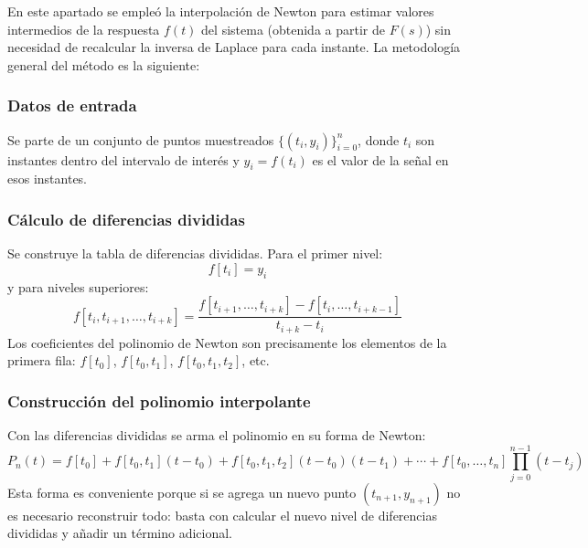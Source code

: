 \documentclass[pdflatex,sn-mathphys-num]{sn-jnl}%
\begin{document}
En este apartado se empleó la interpolación de Newton para estimar valores intermedios de la respuesta $f(t)$ del sistema (obtenida a partir de $F(s)$) sin necesidad de recalcular la inversa de Laplace para cada instante. La metodología general del método es la siguiente:

\subsubsection{Datos de entrada}
Se parte de un conjunto de puntos muestreados $\{(t_i, y_i)\}_{i=0}^{n}$, donde $t_i$ son instantes dentro del intervalo de interés y $y_i=f(t_i)$ es el valor de la señal en esos instantes.

\subsubsection{Cálculo de diferencias divididas}
Se construye la tabla de diferencias divididas. Para el primer nivel:
\begin{equation}
f[t_i]=y_i
\end{equation}
y para niveles superiores:
\begin{equation}
f[t_i,t_{i+1},\dots,t_{i+k}]=\frac{f[t_{i+1},\dots,t_{i+k}]-f[t_i,\dots,t_{i+k-1}]}{t_{i+k}-t_i}
\end{equation}
Los coeficientes del polinomio de Newton son precisamente los elementos de la primera fila: $f[t_0]$, $f[t_0,t_1]$, $f[t_0,t_1,t_2]$, etc.

\subsubsection{Construcción del polinomio interpolante}
Con las diferencias divididas se arma el polinomio en su forma de Newton:
\begin{equation}
P_n(t)=f[t_0]+
f[t_0,t_1](t-t_0)+
f[t_0,t_1,t_2](t-t_0)(t-t_1)+\cdots+
f[t_0,\dots,t_n]\prod_{j=0}^{n-1}(t-t_j)
\end{equation}
Esta forma es conveniente porque si se agrega un nuevo punto $(t_{n+1},y_{n+1})$ no es necesario reconstruir todo: basta con calcular el nuevo nivel de diferencias divididas y añadir un término adicional.
\end{document}
